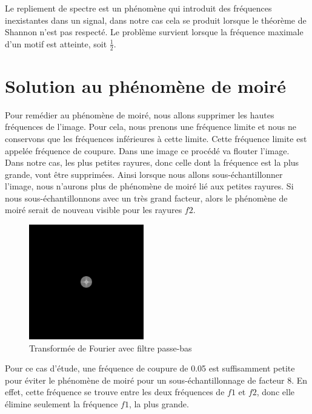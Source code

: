 \documentclass[a4paper,11pt]{article}
\begin{document}
  Le repliement de spectre est un phénomène qui introduit des fréquences inexistantes dans 
  un signal, dans notre cas cela se produit lorsque le théorème de Shannon n’est pas respecté.
  Le problème survient lorsque la fréquence maximale d’un motif est atteinte, soit $\frac{1}{2}$.\\

  \newpage
  
  \section{Solution au phénomène de moiré}
  
  Pour remédier au phénomène de moiré, nous allons supprimer les hautes fréquences 
  de l'image. Pour cela, nous prenons une fréquence limite et nous ne conservons 
  que les fréquences inférieures à cette limite. Cette fréquence limite est 
  appelée fréquence de coupure. Dans une image ce procédé va flouter l'image. 
  Dans notre cas, les plus petites rayures, donc celle dont la fréquence est la plus grande,
  vont être supprimées. Ainsi lorsque nous allons sous-échantillonner l'image, nous n'aurons plus de phénomène
  de moiré lié aux petites rayures. Si nous sous-échantillonnons avec un très grand facteur, alors le phénomène 
  de moiré serait de nouveau visible pour les rayures $f2$.\\
  
  \begin{figure}[H]
  \centering
   \includegraphics[width=5cm]{../FFT_1024_moire.png}
   \caption{Transformée de Fourier avec filtre passe-bas}
  \end{figure}
  
  Pour ce cas d'étude, une fréquence de coupure de 0.05 est suffisamment petite 
  pour éviter le phénomène de moiré pour un sous-échantillonnage de facteur 8. 
  En effet, cette fréquence se trouve entre les deux fréquences de $f1$ et $f2$, donc 
  elle élimine seulement la fréquence $f1$, la plus grande.\\
  
\end{document}

